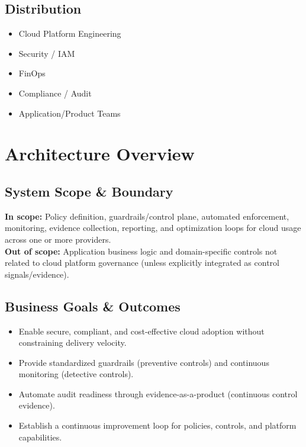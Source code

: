 \documentclass[11pt]{report}
\begin{document}
\section*{Distribution}
\begin{itemize}
  \item Cloud Platform Engineering
  \item Security / IAM
  \item FinOps
  \item Compliance / Audit
  \item Application/Product Teams
\end{itemize}

\clearpage

\chapter{Architecture Overview}
\section{System Scope \& Boundary}
\begin{viewbox}
\textbf{In scope:} Policy definition, guardrails/control plane, automated enforcement, monitoring,
evidence collection, reporting, and optimization loops for cloud usage across one or more providers.\\
\textbf{Out of scope:} Application business logic and domain-specific controls not related to cloud
platform governance (unless explicitly integrated as control signals/evidence).
\end{viewbox}

\section{Business Goals \& Outcomes}
\begin{itemize}
  \item Enable secure, compliant, and cost-effective cloud adoption without constraining delivery velocity.
  \item Provide standardized guardrails (preventive controls) and continuous monitoring (detective controls).
  \item Automate audit readiness through evidence-as-a-product (continuous control evidence).
  \item Establish a continuous improvement loop for policies, controls, and platform capabilities.
\end{itemize}
\end{document}

